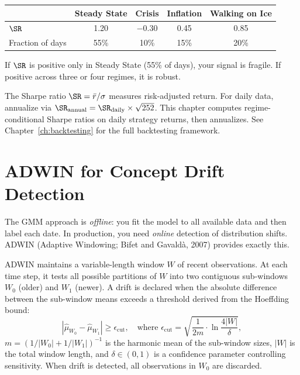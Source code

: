 \begin{center}
\begin{tabular}{lcccc}
  \toprule
  & Steady State & Crisis & Inflation & Walking on Ice \\
  \midrule
  $\SR$ & 1.20 & $-0.30$ & 0.45 & 0.85 \\
  Fraction of days & 55\% & 10\% & 15\% & 20\% \\
  \bottomrule
\end{tabular}
\end{center}

If $\SR$ is positive only in Steady State (55\% of days), your signal is
fragile.  If positive across three or four regimes, it is robust.

\begin{prereq}
The Sharpe ratio $\SR = \bar{r}/\sigma$ measures risk-adjusted return.
For daily data, annualize via $\SR_{\text{annual}} = \SR_{\text{daily}}
\times \sqrt{252}$.  This chapter computes regime-conditional Sharpe
ratios on daily strategy returns, then annualizes.  See
Chapter~\ref{ch:backtesting} for the full backtesting framework.
\end{prereq}

\section{ADWIN for Concept Drift Detection}
\label{sec:regimes:adwin}

The GMM approach is \emph{offline}: you fit the model to all available data
and then label each date.  In production, you need \emph{online} detection
of distribution shifts.  ADWIN (Adaptive Windowing; Bifet and Gavald\`{a},
2007) provides exactly this.

\begin{definition}
ADWIN maintains a variable-length window $W$ of recent observations.  At
each time step, it tests all possible partitions of $W$ into two contiguous
sub-windows $W_0$ (older) and $W_1$ (newer).  A drift is declared when the
absolute difference between the sub-window means exceeds a threshold
derived from the Hoeffding bound:
\begin{equation}
  |\hat{\mu}_{W_0} - \hat{\mu}_{W_1}| \geq \epsilon_{\text{cut}},
  \quad \text{where } \epsilon_{\text{cut}}
  = \sqrt{\frac{1}{2m}\cdot \ln \frac{4|W|}{\delta}},
  \label{eq:adwin}
\end{equation}
$m = (1/|W_0| + 1/|W_1|)^{-1}$ is the harmonic mean of the sub-window
sizes, $|W|$ is the total window length, and $\delta \in (0,1)$ is a
confidence parameter controlling sensitivity.  When drift is detected,
all observations in $W_0$ are discarded.
\end{definition}

